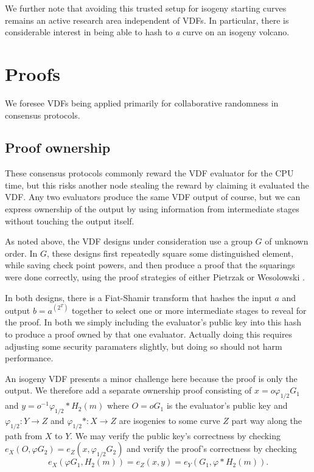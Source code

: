 \documentclass{article}
\newcommand\mathperiod{.}
\begin{document}
We further note that avoiding this trusted setup for isogeny starting
curves remains an active research area independent of VDFs. 
In particular, there is considerable interest in being able to hash to
{\it a} curve on an isogeny volcano.


\section{Proofs}

We foresee VDFs being applied primarily for collaborative randomness
in consensus protocols.  

\subsection{Proof ownership}

These consensus protocols commonly reward the VDF evaluator for the
CPU time, but this risks another node stealing the reward by claiming
it evaluated the VDF.  Any two evaluators produce the same VDF output
of course, but we can express ownership of the output by using
information from intermediate stages without touching the output itself.

As noted above, the VDF designs under consideration use a group $G$
of unknown order.  In $G$, these designs first repeatedly square
some distinguished element, while saving check point powers, and
then produce a proof that the squarings were done correctly, using
the proof strategies of
 either Pietrzak \cite{Pietrzak} or Wesolowski \cite{Wesolowski}.

In both designs, there is a Fiat-Shamir transform that hashes the
input $a$ and output $b = a^(2^T)$ together to select one or more
intermediate stages to reveal for the proof.  In both we simply
including the evaluator's public key into this hash to produce a
proof owned by that one evaluator.  Actually doing this requires
adjusting some security paramaters slightly, but doing so should not
harm performance. 

An isogeny VDF presents a minor challenge here because the proof
is only the output.  We therefore add a separate ownership proof
consisting of $x = o φ_{1/2} G_1$ and $y = o^{-1} φ_{1/2}* H_2(m)$
where $O = o G_1$ is the evaluator's public key and
$φ_{1/2} : Y \to Z$ and $φ_{1/2}* : X \to Z$ are isogenies to
some curve $Z$ part way along the path from $X$ to $Y$.
We may verify the public key's correctness by checking
$e_X(O, φ G_2) = e_Z(x, φ_{1/2} G_2)$ and verify the proof's correctness by
checking
$$ e_X( φ G_1, H_2(m) ) = e_Z( x, y ) = e_Y( G_1, φ* H_2(m) ) \mathperiod $$
\end{document}
